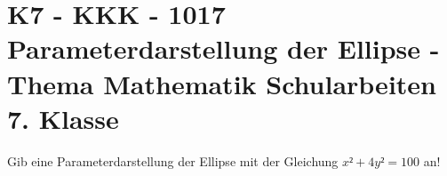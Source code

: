\section{K7 - KKK - 1017 Parameterdarstellung der Ellipse - Thema Mathematik Schularbeiten 7. Klasse}

\begin{beispiel}[K7 - KKK]{1} %
			Gib eine Parameterdarstellung der Ellipse mit der Gleichung $x²+4y²=100$ an!
			
			\end{beispiel}
